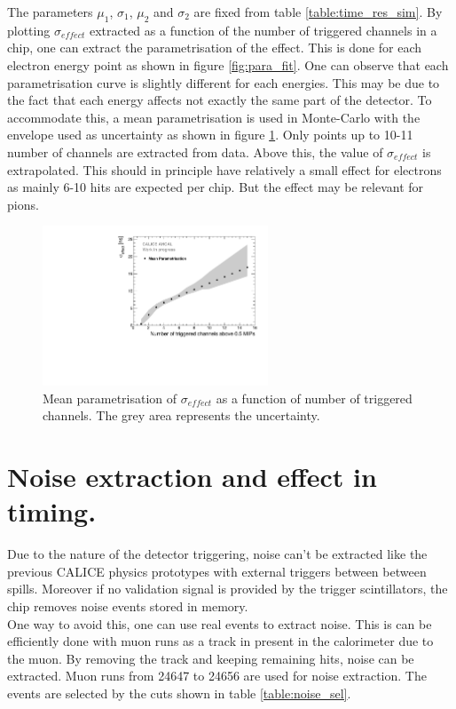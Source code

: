 \documentclass[twoside,a4paper,11pt]{article}
\begin{document}
\begin{appendix}
The parameters $\mu_1$, $\sigma_1$, $\mu_2$ and $\sigma_2$ are fixed from table \ref{table:time_res_sim}. By plotting $\sigma_{effect}$ extracted as a function of the number of triggered channels in a chip, one can extract the parametrisation of the effect. This is done for each electron energy point as shown in figure \ref{fig:para_fit}. One can observe that each parametrisation curve is slightly different for each energies. This may be due to the fact that each energy affects not exactly the same part of the detector. To accommodate this, a mean parametrisation is used in Monte-Carlo with the envelope used as uncertainty as shown in figure \ref{fig:mean_para}. Only points up to 10-11 number of channels are extracted from data. Above this, the value of $\sigma_{effect}$ is extrapolated. This should in principle have relatively a small effect for electrons as mainly 6-10 hits are expected per chip. But the effect may be relevant for pions.

\begin{figure}[htbp]
\begin{center}
\includegraphics[width=0.6\textwidth]{fig/Electrons/MeanParametrisationWithSystErrors.pdf}
\caption{Mean parametrisation of $\sigma_{effect}$ as a function of number of triggered channels. The grey area represents the uncertainty.}
\label{fig:mean_para}
\end{center}
\end{figure}

\newpage
\section{Noise extraction and effect in timing.}
\label{appendix:noise}

Due to the nature of the detector triggering, noise can't be extracted like the previous CALICE physics prototypes with external triggers between between spills. Moreover if no validation signal is provided by the trigger scintillators, the chip removes noise events stored in memory.\\
One way to avoid this, one can use real events to extract noise. This is can be efficiently done with muon runs as a track in present in the calorimeter due to the muon. By removing the track and keeping remaining hits, noise can be extracted. Muon runs from 24647 to 24656 are used for noise extraction. The events are selected by the cuts shown in table \ref{table:noise_sel}.


\end{appendix}
\end{document}
